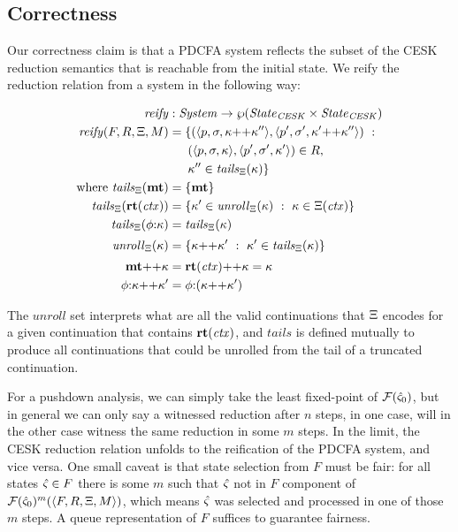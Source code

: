 \subsection{Correctness}

Our correctness claim is that a PDCFA system reflects the subset of the CESK reduction semantics that is reachable from the initial state.
%
We reify the reduction relation from a system in the following way:

\begin{align*}
  \reify &: \mathit{System} \to \wp(\mathit{State}_\mathit{CESK} \times \mathit{State}_\mathit{CESK}) \\
  \reify(F, R, \mktab, \mmemo) &=
  \setbuild{(\tpl{\mpoint,\mstore,\append{\mkont}{\mkont''}},
             \tpl{\mpoint',\mstore',\append{\mkont'}{\mkont''}})}
           {\\ &\phantom{= \{}(\tpl{\mpoint,\mstore,\mkont}, \tpl{\mpoint',\mstore',\mkont'}) \in R,
            \\ &\phantom{= \{}\mkont'' \in \tails{\mktab}{\mkont}} \\
\text{where } \tails{\mktab}{\kmt} &= \set{\kmt} \\
              \tails{\mktab}{\krt{\mctx}} &= \setbuild{\mkont' \in \unroll{\mktab}{\mkont}}{\mkont \in \mktab(\mctx)} \\
              \tails{\mktab}{\kcons{\mkframe}{\mkont}} &= \tails{\mktab}{\mkont}
\\[2pt]
              \unroll{\mktab}{\mkont} &= \setbuild{\append{\mkont}{\mkont'}}{\mkont' \in \tails{\mktab}{\mkont}}
\\[2pt]
              \append{\kmt}{\mkont} &= \append{\krt{\mctx}}{\mkont} = \mkont \\
              \append{\kcons{\mkframe}{\mkont}}{\mkont'} &= \kcons{\mkframe}{(\append{\mkont}{\mkont'})}
\end{align*}

The $\mathit{unroll}$ set interprets what are all the valid continuations that $\Xi$ encodes for a given continuation that contains $\mathbf{rt}(\mathit{ctx})$, and $\mathit{tails}$ is defined mutually to produce all continuations that could be unrolled from the tail of a truncated continuation.

For a pushdown analysis, we can simply take the least fixed-point of ${\mathcal F}(\hat\varsigma_0)$, but in general we can only say a witnessed reduction after $n$ steps, in one case, will in the other case witness the same reduction in some $m$ steps.
%
In the limit, the CESK reduction relation unfolds to the reification of the PDCFA system, and vice versa.
%
One small caveat is that state selection from $F$ must be fair: for all states $\hat\varsigma \in F$ there is some $m$ such that $\hat\varsigma$ not in $F$ component of ${\mathcal F}(\hat\varsigma_0)^m(\langle F,R,\Xi,M \rangle)$, which means $\hat\varsigma$ was selected and processed in one of those $m$ steps.
%
A queue representation of $F$ suffices to guarantee fairness.

